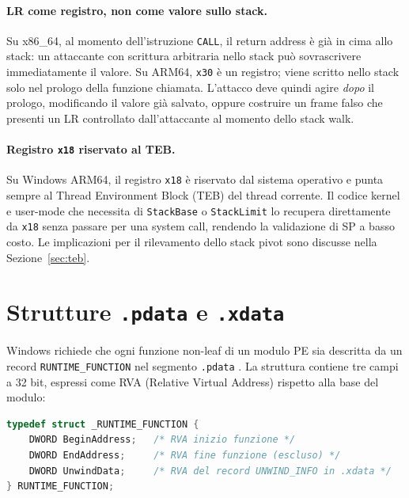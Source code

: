 \paragraph{LR come registro, non come valore sullo stack.}
Su x86\_64, al momento dell'istruzione \texttt{CALL}, il return address è già
in cima allo stack: un attaccante con scrittura arbitraria nello stack può
sovrascrivere immediatamente il valore. Su ARM64, \texttt{x30} è un registro;
viene scritto nello stack solo nel prologo della funzione chiamata. L'attacco
deve quindi agire \emph{dopo} il prologo, modificando il valore già salvato, oppure costruire un frame falso che presenti un LR controllato
dall'attaccante al momento dello stack walk.

\paragraph{Registro \texttt{x18} riservato al TEB.}
Su Windows ARM64, il registro \texttt{x18} è riservato dal sistema operativo
e punta sempre al Thread Environment Block (TEB) del thread corrente. Il codice
kernel e user-mode che necessita di \texttt{StackBase} o \texttt{StackLimit}
lo recupera direttamente da \texttt{x18} senza passare per una system call,
rendendo la validazione di SP a basso costo. Le implicazioni per il rilevamento
dello stack pivot sono discusse nella Sezione~\ref{sec:teb}.


\section{Strutture \texttt{.pdata} e \texttt{.xdata}}

Windows richiede che ogni funzione non-leaf di un modulo PE sia descritta da
un record \texttt{RUNTIME\_FUNCTION} nel segmento \texttt{.pdata} \cite{mspdata}.
La struttura contiene tre campi a 32 bit, espressi come RVA (Relative Virtual
Address) rispetto alla base del modulo:

\begin{lstlisting}[style=cstyle, language=C, caption={Struttura \texttt{RUNTIME\_FUNCTION} in \texttt{.pdata} (ARM64)},
label={lst:runtime-function}]
typedef struct _RUNTIME_FUNCTION {
    DWORD BeginAddress;   /* RVA inizio funzione */
    DWORD EndAddress;     /* RVA fine funzione (escluso) */
    DWORD UnwindData;     /* RVA del record UNWIND_INFO in .xdata */
} RUNTIME_FUNCTION;
\end{lstlisting}

